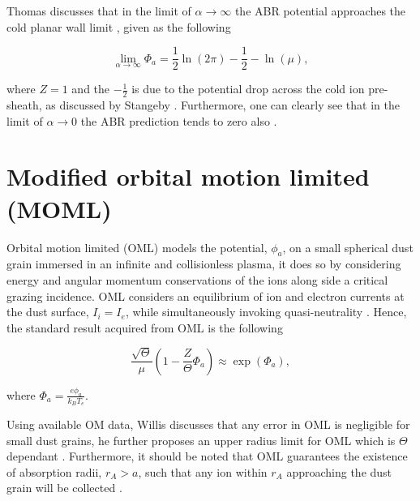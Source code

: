 \documentclass{article}
\begin{document}
Thomas discusses that in the limit of $\alpha \to \infty$ the ABR potential approaches
the cold planar wall limit \cite{Thomas}, given as the following 

\begin{equation}\label{eq:ABRLim}
\lim_{\alpha \to \infty} \Phi_a = \frac{1}{2}\ln{\left(2 \pi \right)} - \frac{1}{2} - \ln{\left(\mu \right)},
\end{equation}

\smallskip

\noindent where $Z = 1$ and the $-\frac{1}{2}$ is due to the potential drop across the cold ion pre-sheath,
as discussed by Stangeby \cite{Stangeby1986} \cite{Stangeby2000}. Furthermore, one can clearly see that in the limit
of $\alpha \to 0$ the ABR prediction tends to zero also \cite{ABR}.

\newpage 

\section{Modified orbital motion limited (MOML)}

\smallskip

Orbital motion limited (OML) models the potential, $\phi_a$, on a small spherical
dust grain immersed in an infinite and collisionless plasma, it does so by considering
energy and angular momentum conservations of the ions along side a critical grazing incidence.
OML considers an equilibrium of ion and electron currents at the dust 
surface, $I_i = I_e$, while simultaneously invoking quasi-neutrality \cite{OriginalOML}.
Hence, the standard result acquired from OML is 
the following

\begin{equation}\label{eq:OMLeqn}
\frac{\sqrt{\Theta}}{\mu} \left(1 - \frac{Z}{\Theta}\Phi_a \right) \approx \exp{\left(\Phi_a\right)},
\end{equation}

\smallskip

\noindent where $\Phi_a = \frac{e\phi_a}{k_B T_e}$.

\medskip

Using available OM data, Willis discusses that any error in OML is negligible for small dust grains,
he further proposes an upper radius limit for OML which is $\Theta$ dependant \cite{Willis}. Furthermore, it should be noted that
OML guarantees the existence of absorption radii, $r_{A} > a$, such that any 
ion within $r_{A}$ approaching the dust grain will be collected \cite{Thomas}. 
\end{document}
